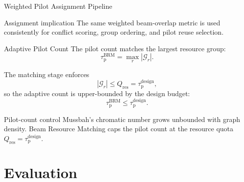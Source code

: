 \documentclass[10pt,aspectratio=169]{beamer}
\newcommand{\taup}{\tau_{\mathrm{p}}}
\newcommand{\taudesign}{\tau_{\mathrm{p}}^{\mathrm{design}}}
\newcommand{\BRM}{Beam Resource Matching}
\begin{document}
\begin{frame}{Weighted Pilot Assignment Pipeline}
\begin{center}
{
        }
    \end{center}

    \vspace{0.45em}
    \begin{block}{Assignment implication}
        The same weighted beam-overlap metric is used consistently for conflict scoring, group ordering, and pilot reuse selection.
    \end{block}
\end{frame}

\begin{frame}{Adaptive Pilot Count}
    \small
    The pilot count matches the largest resource group:
    \[
        \taup^{\mathrm{BRM}}
        =
        \max_{r}|\mathcal{G}_r|.
    \]

    The matching stage enforces
    \[
        |\mathcal{G}_r| \le Q_{\mathrm{res}}=\taudesign,
    \]
    so the adaptive count is upper-bounded by the design budget:
    \[
        \taup^{\mathrm{BRM}}\le \taudesign.
    \]

    \vspace{0.5em}
    \begin{block}{Pilot-count control}
        Mussbah's chromatic number grows unbounded with graph density. \BRM{} caps the pilot count at the resource quota \(Q_{\mathrm{res}}=\taudesign\).
    \end{block}
\end{frame}

\section{Evaluation}
\end{document}
